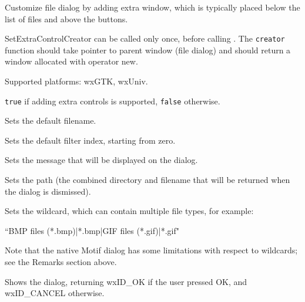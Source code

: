 Customize file dialog by adding extra window, which is typically placed
below the list of files and above the buttons.

SetExtraControlCreator can be called only once, before calling
.
The {\tt creator} function should take pointer to parent window (file dialog)
and should return a window allocated with operator new.

Supported platforms: wxGTK, wxUniv.

{\tt true} if adding extra controls is supported, {\tt false} otherwise.

\label{wxfiledialogsetfilename}


Sets the default filename.

\label{wxfiledialogsetfilterindex}


Sets the default filter index, starting from zero.

\label{wxfiledialogsetmessage}


Sets the message that will be displayed on the dialog.

\label{wxfiledialogsetpath}


Sets the path (the combined directory and filename that will be returned when the dialog is dismissed).

\label{wxfiledialogsetwildcard}


Sets the wildcard, which can contain multiple file types, for example:

``BMP files (*.bmp)|*.bmp|GIF files (*.gif)|*.gif"

Note that the native Motif dialog has some limitations with respect to
wildcards; see the Remarks section above.

\label{wxfiledialogshowmodal}


Shows the dialog, returning wxID\_OK if the user pressed OK, and wxID\_CANCEL
otherwise.


